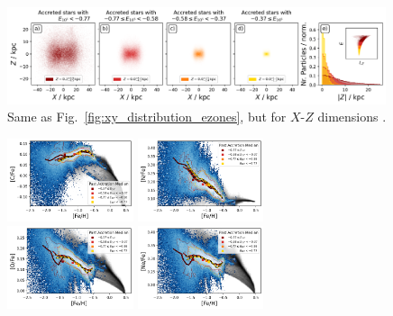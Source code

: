 \documentclass[fleqn,usenatbib]{mnras}
\begin{document}
\begin{figure}
    \centering
    \includegraphics[width=0.99\textwidth]{figures/xz_distribution_ezones.png}
    \caption{Same as Fig.~\ref{fig:xy_distribution_ezones}, but for $X$-$Z$ dimensions \href{https://github.com/svenbuder/gse_nihaouhd/tree/main/figures}{\faGithub}.}
    \label{fig:xz_distribution_ezones}
\end{figure}

\begin{figure}
    \centering
    \includegraphics[width=0.33\textwidth]{figures/xfe_feh_zones_C.png}
    \includegraphics[width=0.33\textwidth]{figures/xfe_feh_zones_N.png}
    \includegraphics[width=0.33\textwidth]{figures/xfe_feh_zones_O.png}
    \includegraphics[width=0.33\textwidth]{figures/xfe_feh_zones_Ne.png}

\end{figure}
\end{document}

